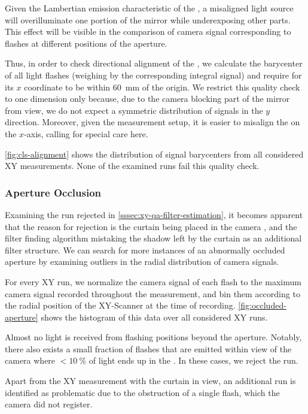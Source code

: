Given the Lambertian emission characteristic of the \CLS, a misaligned light
source will overilluminate one portion of the mirror while underexposing
other parts. This effect will be visible in the comparison of camera signal 
corresponding to flashes at different positions of the aperture.

Thus, in order to check directional alignment of the \CLS, we calculate the
barycenter of all light flashes (weighing by the corresponding integral \FD 
signal) and require for its $x$ coordinate to be within \SI{60}{\milli\meter} of
the origin. We restrict this quality check to one dimension only because, due to
the camera blocking part of the mirror from view, we do not expect a symmetric 
distribution of signals in the $y$ direction. Moreover, given the measurement 
setup, it is easier to misalign the \CLS on the $x$-axis, calling for special 
care here.

\cref{fig:cls-alignment} shows the distribution of signal barycenters from all 
considered XY measurements. None of the examined runs fail this quality check.

\subsubsection{Aperture Occlusion}
\label{sssec:xy-qa-aperture-occlusion}

Examining the run rejected in \cref{sssec:xy-qa-filter-estimation}, it becomes 
apparent that the reason for rejection is the curtain being placed in the camera
\FOV, and the filter finding algorithm mistaking the shadow left by the curtain
as an additional filter structure. We can search for more instances of an 
abnormally occluded aperture by examining outliers in the radial distribution of
camera signals. 

For every XY run, we normalize the camera signal of each flash to the maximum 
camera signal recorded throughout the measurement, and bin them according to the
radial position of the XY-Scanner at the time of recording. 
\cref{fig:occluded-aperture} shows the histogram of this data over all 
considered XY runs.

Almost no light is received from flashing positions beyond the aperture. 
Notably, there also exists a small fraction of flashes that are emitted within 
view of the camera where $<\SI{10}{\percent}$ of light ends up in the \FD. In 
these cases, we reject the run.

Apart from the XY measurement with the curtain in view, an additional run is 
identified as problematic due to the obstruction of a single flash, which the
\FD camera did not register.

